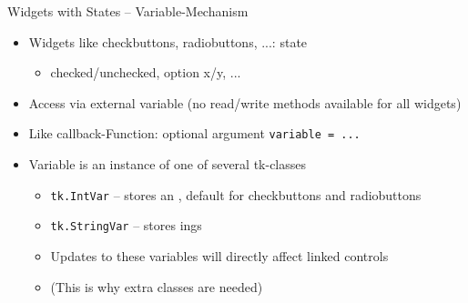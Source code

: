 \begin{frame}[fragile]{Widgets with States -- Variable-Mechanism}
%
\begin{itemize}
\item Widgets like checkbuttons, radiobuttons, ...: state
	\begin{itemize}
	\item checked/unchecked, option x/y, ...
	\end{itemize}
\item Access via external variable (\ie no read/write methods available for all widgets)
\item Like callback-Function: optional argument \texttt{variable = ...}
\item Variable is an instance of one of several tk-classes
	\begin{itemize}
	\item \texttt{tk.IntVar} -- stores an , default for checkbuttons and radiobuttons
	\item \texttt{tk.StringVar} -- stores ings
	\item Updates to these variables will directly affect linked controls
	\item (This is why extra classes are needed)
	\end{itemize}
\end{itemize}
%
\end{frame}


